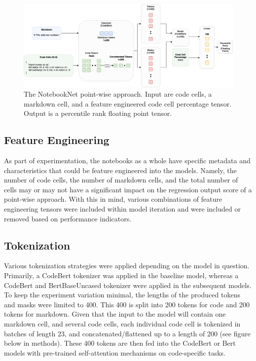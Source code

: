 \documentclass[conference]{IEEEtran}
\begin{document}
\begin{figure}
  \centering
  \includegraphics[width=\textwidth]{baseline}
  \caption{The NotebookNet point-wise approach. Input are code cells, a markdown cell, and a feature engineered code cell percentage tensor. Output is a percentile rank floating point tensor.}
\end{figure}

\subsection{Feature Engineering}
As part of experimentation, the notebooks as a whole have specific metadata and characteristics that could be feature engineered into the models. Namely, the number of code cells, the number of markdown cells, and the total number of cells may or may not have a significant impact on the regression output score of a point-wise approach. With this in mind, various combinations of feature engineering tensors were included within model iteration and were included or removed based on performance indicators.

\subsection{Tokenization}
Various tokenization strategies were applied depending on the model in question. Primarily, a CodeBert tokenizer was applied in the baseline model, whereas a CodeBert and BertBaseUncased tokenizer were applied in the subsequent models. To keep the experiment variation minimal, the lengths of the produced tokens and masks were limited to 400. This 400 is split into 200 tokens for code and 200 tokens for markdown. Given that the input to the model will contain one markdown cell, and several code cells, each individual code cell is tokenized in batches of length 23, and concatenated/flattened up to a length of 200 (see figure below in methods). These 400 tokens are then fed into the CodeBert or Bert models with pre-trained self-attention mechanisms on code-specific tasks.
\end{document}
